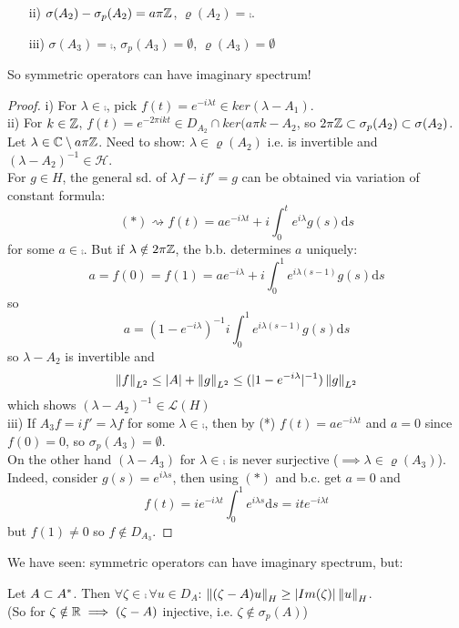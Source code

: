 \documentclass{article}
\begin{document}
\begin{example}
\begin{itemize}
		\item [ii)] $\sigma(A_2)-\sigma_p(A_2)=a\pi\mathbb{Z}$, $\varrho(A_2)=\comp$.
		\item [iii)] $\sigma(A_3)=\comp$, $\sigma_p(A_3)=\emptyset$, $\varrho(A_3)=\emptyset$
	\end{itemize}
	So symmetric operators can have imaginary spectrum!
	\begin{proof}
		i) For $\lambda\in\comp$, pick $f(t)=e^{-i\lambda t}\in ker(\lambda-A_1)$.\\
		ii) For $k\in\mathbb{Z}$, $f(t)=e^{-2\pi ikt}\in D_{A_2}\cap ker(a\pi k-A_2$,
		so $2\pi \mathbb{Z}\subset \sigma_p(A_2)\subset\sigma(A_2)$.
		Let $\lambda\in\mathbb{C}\setminus a\pi\mathbb{Z}$.
		Need to show: $\lambda\in\varrho(A_2)$ i.e.  is invertible and $(\lambda-A_2)^{-1}\in\mathcal{H}$.\\
		For $g\in H$, the general sd. of $\lambda f-if'=g$ can be obtained via variation of constant formula:
		$$
			(*)\rightsquigarrow f(t)=ae^{-i\lambda t}+i \int_0^t e^{i\lambda}g(s)\mathrm{d}s
		$$
		for some $a\in\comp$. But if $\lambda\notin2\pi\mathbb{Z}$, the b.b. determines $a$ uniquely:
		$$
			a=f(0)=f(1)=ae^{-i\lambda}+i\int_0^1e^{i\lambda(s-1)}g(s)\mathrm{d}s$$
		so
		$$
			a=(1-e^{-i\lambda})^{-1}i\int_0^1e^{i\lambda(s-1)}g(s)\mathrm{d}s
		$$
		so $\lambda-A_2$ is invertible and
		$$
        \left\|{f}\right\|_{L^2}\leq |A|+\left\|{g}\right\|_{L^2}\leq(|1-e^{-i\lambda}|^{-1})\left\|{g}\right\|_{L^2}
        $$
		which shows $(\lambda-A_2)^{-1}\in\mathcal{L}(H)$\\
		iii) If $A_3f=if'=\lambda f$ for some $\lambda\in\comp$, then by (*) $f(t)=ae^{-i\lambda t}$ and $a=0$ since $f(0)=0$, so $\sigma_p(A_3)=\emptyset$.\\
		On the other hand $(\lambda-A_3)$ for $\lambda\in\comp$ is never surjective ($\implies \lambda\in\varrho(A_3)$). Indeed, consider $g(s)=e^{i\lambda s}$, then using $(*)$ and b.c. get $a=0$ and
		$$
        f(t)=ie^{-i\lambda t}\int_0^1e^{i\lambda s} \mathrm{d}s=ite^{-i\lambda t}
        $$
		but $f(1)\neq0$ so $f\notin D_{A_3}$.
	\end{proof}
\end{example}
We have seen: symmetric operators can have imaginary spectrum, but:
\begin{lemma}
\label{images of symmetric operators bounded below by imaginary part}
	Let $A\subset {A}^*$. Then $\forall\zeta\in\comp\,\forall u\in D_A$: $\left\|{(\zeta-A)u}\right\|_H\geq |Im(\zeta)|\left\|{u}\right\|_H$.\\
	(So for $\zeta\notin\mathbb{R}\implies(\zeta-A)$ injective, i.e. $\zeta\notin\sigma_p(A)$)
\end{lemma}
\end{document}

